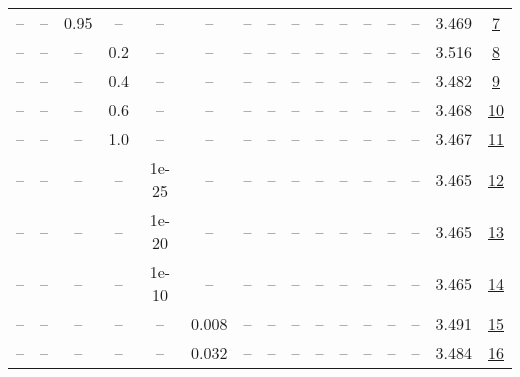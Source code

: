 \begin{table}[H]
\begin{tabular}{cccccccccccccccc}
-- & -- & 0.95 & -- & -- & -- & -- & -- & -- & -- & -- & -- & -- & -- & 3.469 & \href{https://wandb.ai/stanford-mercury/optimizer-scaling/runs/sweep-130m-2B-muonac6a7elr0.016-wd0.1-minlr0-warmup0-b10.8-b20.9-6e2488}{7} \\
-- & -- & -- & 0.2 & -- & -- & -- & -- & -- & -- & -- & -- & -- & -- & 3.516 & \href{https://wandb.ai/stanford-mercury/optimizer-scaling/runs/sweep-130m-2B-muonc9c69flr0.016-wd0.1-minlr0-warmup0-b10.8-b20.9-26363a}{8} \\
-- & -- & -- & 0.4 & -- & -- & -- & -- & -- & -- & -- & -- & -- & -- & 3.482 & \href{https://wandb.ai/stanford-mercury/optimizer-scaling/runs/sweep-130m-2B-muon4327fdlr0.016-wd0.1-minlr0-warmup0-b10.8-b20.9-fdb346}{9} \\
-- & -- & -- & 0.6 & -- & -- & -- & -- & -- & -- & -- & -- & -- & -- & 3.468 & \href{https://wandb.ai/stanford-mercury/optimizer-scaling/runs/sweep-130m-2B-muonc0a98clr0.016-wd0.1-minlr0-warmup0-b10.8-b20.9-c9b3e6}{10} \\
-- & -- & -- & 1.0 & -- & -- & -- & -- & -- & -- & -- & -- & -- & -- & 3.467 & \href{https://wandb.ai/stanford-mercury/optimizer-scaling/runs/sweep-130m-2B-muon71f572lr0.016-wd0.1-minlr0-warmup0-b10.8-b20.9-931ae1}{11} \\
-- & -- & -- & -- & 1e-25 & -- & -- & -- & -- & -- & -- & -- & -- & -- & 3.465 & \href{https://wandb.ai/stanford-mercury/optimizer-scaling/runs/sweep-130m-2B-muon132aealr0.016-wd0.1-minlr0-warmup0-b10.8-b20.9-a85203}{12} \\
-- & -- & -- & -- & 1e-20 & -- & -- & -- & -- & -- & -- & -- & -- & -- & 3.465 & \href{https://wandb.ai/stanford-mercury/optimizer-scaling/runs/sweep-130m-2B-muon1ea81alr0.016-wd0.1-minlr0-warmup0-b10.8-b20.9-08c77c}{13} \\
-- & -- & -- & -- & 1e-10 & -- & -- & -- & -- & -- & -- & -- & -- & -- & 3.465 & \href{https://wandb.ai/stanford-mercury/optimizer-scaling/runs/sweep-130m-2B-muonf91efdlr0.016-wd0.1-minlr0-warmup0-b10.8-b20.9-e3d863}{14} \\
-- & -- & -- & -- & -- & 0.008 & -- & -- & -- & -- & -- & -- & -- & -- & 3.491 & \href{https://wandb.ai/stanford-mercury/optimizer-scaling/runs/sweep-130m-2B-muon60167clr0.008-wd0.1-minlr0-warmup0-b10.8-b20.9-9ba062}{15} \\
-- & -- & -- & -- & -- & 0.032 & -- & -- & -- & -- & -- & -- & -- & -- & 3.484 & \href{https://wandb.ai/stanford-mercury/optimizer-scaling/runs/sweep-130m-2B-muonadc334lr0.032-wd0.1-minlr0-warmup0-b10.8-b20.9-0f8112}{16} \\

\end{tabular}
\end{table}
